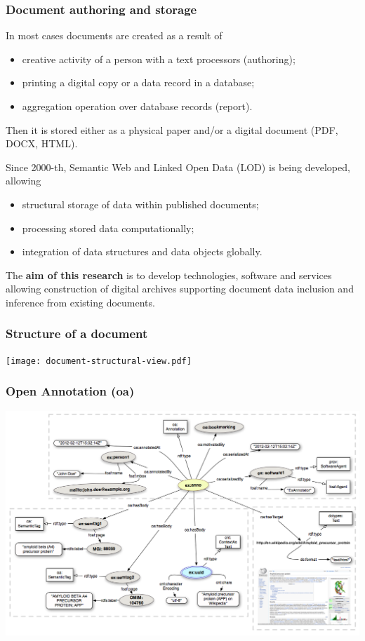 \documentclass[10pt]{beamer}
\begin{document}
\begin{frame}
  \frametitle{Document authoring and storage}
  In most cases documents are created as a result of
  \begin{itemize}
  \item creative activity of a person with a text processors (authoring);
  \item printing a digital copy or a data record in a database;
  \item aggregation operation over database records (report).
  \end{itemize}
  Then it is stored either as a physical paper and/or a digital document (PDF, DOCX, HTML).

  Since 2000-th, Semantic Web and Linked Open Data (LOD) is being developed, allowing
  \begin{itemize}
  \item structural storage of data within published documents;
  \item processing stored data computationally;
  \item integration of data structures and data objects globally.
  \end{itemize}

  The \textbf{aim of this research} is to develop technologies, software and services allowing construction of digital archives supporting document data inclusion and inference from existing documents.
\end{frame}

\begin{frame}
  \frametitle{Structure of a document}
  \centering
  \texttt{[image: document-structural-view.pdf]}
\end{frame}

\begin{frame}
  \frametitle{Open Annotation (oa)}
\begin{adjustwidth}{-3em}{-3em}
  \centering
  \includegraphics[width=1\linewidth]{Open-Annotation_CB_Bookmarking_and_Semantically_Tagging_A_webpage_spec20130128.png}
\end{adjustwidth}

\end{frame}
\end{document}
